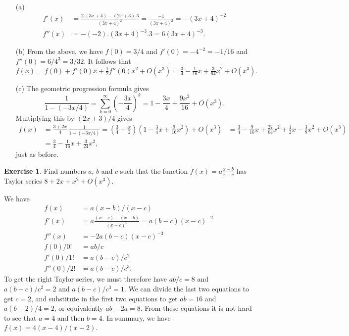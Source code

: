 \documentclass[a4paper]{amsart}
\theoremstyle{definition}
\newtheorem{exercise}{Exercise}[section]
\newenvironment{solution}{{\noindent \bf Solution:}}{}
\begin{document}
\begin{solution}
\begin{itemize}
  \item[(a)] 
   \begin{align*}
    f'(x)  &= \frac{2.(3x+4) - (2x+3).3}{(3x+4)^2}
            = \frac{-1}{(3x+4)^2} = -(3x+4)^{-2} \\
    f''(x) &= - (-2).(3x+4)^{-3}.3 = 6(3x+4)^{-3}.
   \end{align*}
  \item[(b)] From the above, we have $f(0)=3/4$ and
   $f'(0)=-4^{-2}=-1/16$ and $f''(0)=6/4^3=3/32$.  It follows
   that 
   \[ f(x) = f(0) + f'(0)x + \tfrac{1}{2}f''(0) x^2 + O(x^3) 
       = \tfrac{3}{4} - \tfrac{1}{16} x + \tfrac{3}{64} x^2
         + O(x^3).
   \]
  \item[(c)] The geometric progression formula gives
   \[ \frac{1}{1-(-3x/4)} = 
      \sum_{k=0}^\infty \left(-\frac{3x}{4}\right)^k = 
      1 - \frac{3x}{4} + \frac{9x^2}{16} + O(x^3).
   \]
   Multiplying this by $(2x+3)/4$ gives
   \begin{align*}
    f(x) &= \frac{3+2x}{4} \, \frac{1}{1 - (-3x/4)}
          = (\tfrac{3}{4} + \tfrac{x}{2})
            (1 - \tfrac{3}{4}x + \tfrac{9}{16}x^2) + O(x^3)
         &= \tfrac{3}{4} - \tfrac{9}{16} x + 
            \tfrac{27}{64} x^2 + \tfrac{1}{2}x -
            \tfrac{3}{8}x^2 + O(x^3) \\
         &= \tfrac{3}{4} - \tfrac{1}{16}x + \tfrac{3}{24} x^2,
   \end{align*}
   just as before.
 \end{itemize}
\end{solution}

\begin{exercise}
 Find numbers $a$, $b$ and $c$ such that the function
 $f(x)=a\frac{x-b}{x-c}$ has Taylor series $8+2x+x^2+O(x^3)$.
\end{exercise}
\begin{solution}
 We have
 \begin{align*}
  f(x) &= a(x-b)/(x-c) \\
  f'(x) &= a\frac{(x-c)-(x-b)}{(x-c)^2} 
         = a(b-c)(x-c)^{-2} \\
  f''(x) &= -2a(b-c)(x-c)^{-3} \\
  f(0)/0! &= ab/c \\
  f'(0)/1! &= a(b-c)/c^2 \\
  f''(0)/2! &= a(b-c)/c^3.
 \end{align*}
 To get the right Taylor series, we must therefore have $ab/c=8$ and
 $a(b-c)/c^2=2$ and $a(b-c)/c^3=1$.  We can divide the last two
 equations to get $c=2$, and substitute in the first two equations to
 get $ab=16$ and $a(b-2)/4=2$, or equivalently $ab-2a=8$.  From these
 equations it is not hard to see that $a=4$ and then $b=4$.  In
 summary, we have $f(x)=4(x-4)/(x-2)$.
\end{solution}
\end{document}
